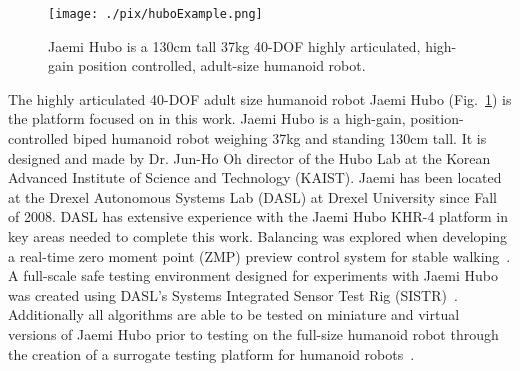 \begin{figure}[t]
  \centering
\texttt{[image: ./pix/huboExample.png]}
  \caption{Jaemi Hubo is a 130cm tall 37kg 40-DOF highly articulated, high-gain position controlled, adult-size humanoid robot.}
  \label{fig:huboFig}
\end{figure}


The highly articulated 40-DOF adult size humanoid robot Jaemi Hubo (Fig.~\ref{fig:huboFig}) is the platform focused on in this work.  Jaemi Hubo is a high-gain, position-controlled biped humanoid robot weighing 37kg and standing 130cm tall.  It is designed and made by Dr. Jun-Ho Oh director of the Hubo Lab at the Korean Advanced Institute of Science and Technology (KAIST).  Jaemi has been located at the Drexel Autonomous Systems Lab (DASL) at Drexel University since Fall of 2008.  DASL has extensive experience with the Jaemi Hubo KHR-4 platform in key areas needed to complete this work.  Balancing was explored when developing a real-time zero moment point (ZMP) preview control system for stable walking~\cite{5686276}.  A full-scale safe testing environment designed for experiments with Jaemi Hubo was created using DASL's Systems Integrated Sensor Test Rig (SISTR)~\cite{5686325}.  Additionally all algorithms are able to be tested on miniature and virtual versions of Jaemi Hubo prior to testing on the full-size humanoid robot through the creation of a surrogate testing platform for humanoid robots~\cite{5379582}.






